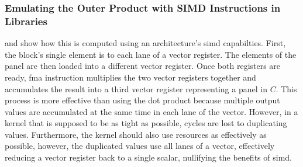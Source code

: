 \documentclass[\main/thesis.tex]{subfiles}
\begin{document}
\subsubsection{Emulating the Outer Product with SIMD Instructions in Libraries}
\label{sec:emulateProduct}
 and  show how this is computed using an architecture's \gls{simd} capabilties.
First, the block's single element is  to each \gls{lane} of a vector register.
The elements of the panel are then loaded into a different vector register.
Once both registers are ready,  \gls{fma} instruction multiplies the two vector registers together and accumulates the result into a third vector register representing a panel in $C$.
This process is more effective than using the dot product because multiple output values are accumulated at the same time in each \gls{lane} of the vector.
However, in a kernel that is supposed to be as tight as possible, cycles are lost to duplicating values.
Furthermore, the kernel should also use resources as effectively as possible, however, the duplicated values use all \glspl{lane} of a vector, effectively reducing a vector register back to a single scalar, nullifying the benefits of \gls{simd}.
\end{document}
